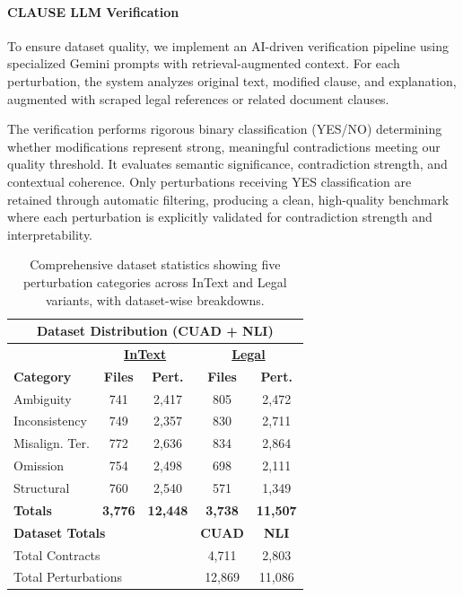\documentclass[11pt]{article}
\newcommand{\datasetName}{{\sc CLAUSE}\xspace}
\begin{document}
\paragraph{\datasetName LLM Verification}
To ensure dataset quality, we implement an AI-driven verification pipeline using specialized Gemini prompts with retrieval-augmented context. For each perturbation, the system analyzes original text, modified clause, and explanation, augmented with scraped legal references or related document clauses.

The verification performs rigorous binary classification (YES/NO) determining whether modifications represent strong, meaningful contradictions meeting our quality threshold. It evaluates semantic significance, contradiction strength, and contextual coherence. Only perturbations receiving YES classification are retained through automatic filtering, producing a clean, high-quality benchmark where each perturbation is explicitly validated for contradiction strength and interpretability.

\begin{table}[h]
\small
\centering
\setlength{\aboverulesep}{0pt}
\setlength{\belowrulesep}{0pt}
\setlength{\tabcolsep}{6pt}
\begin{tabular}{p{2.0cm}cccc}
\toprule
\multicolumn{5}{c}{\textbf{Dataset Distribution (CUAD + NLI)}} \\
\midrule
& \multicolumn{2}{c}{\underline{\textbf{InText}}} & \multicolumn{2}{c}{\underline{\textbf{Legal}}} \\
\textbf{Category} & \textbf{Files} & \textbf{Pert.} & \textbf{Files} & \textbf{Pert.} \\
\midrule
Ambiguity          & 741 & 2,417 & 805 & 2,472 \\
Inconsistency    & 749 & 2,357 & 830 & 2,711 \\
Misalign. Ter.   & 772 & 2,636 & 834 & 2,864 \\
Omission           & 754 & 2,498 & 698 & 2,111 \\
Structural   & 760 & 2,540 & 571 & 1,349 \\
\midrule
\textbf{Totals}   & \textbf{3,776} & \textbf{12,448} & \textbf{3,738} & \textbf{11,507} \\
\midrule
\multicolumn{3}{l}{\textbf{Dataset Totals}} & \textbf{CUAD} & \textbf{NLI} \\
\multicolumn{3}{l}{Total Contracts} & 4,711 & 2,803 \\
\multicolumn{3}{l}{Total Perturbations} & 12,869 & 11,086 \\
\bottomrule
\end{tabular}
\caption{\small Comprehensive dataset statistics showing five perturbation categories across InText and Legal variants, with dataset-wise breakdowns.}
\label{tab:combined_dataset_summary}
\end{table}
\end{document}
